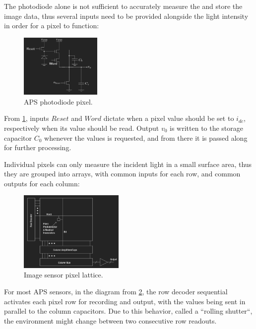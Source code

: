 The photodiode alone is not sufficient to accurately measure the and store the image data, thus several inputs need to
be provided alongside the light intensity in order for a pixel to function:

\begin{figure}[H]
    \includegraphics[width=0.35\textwidth, height=0.35\textwidth]{resources/png/pixel.png}
    \caption{APS photodiode pixel. \cite{stanford} \label{figPixel}}
\end{figure}

From \ref{figPixel}, inputs \(Reset\) and \(Word\) dictate when a pixel value should be set to \(i_{dc}\), respectively
when its value should be read. Output \(v_{0}\) is written to the storage capacitor \(C_{0}\) whenever the values
is requested, and from there it is passed along for further processing.

Individual pixels can only measure the incident light in a small surface area, thus they are grouped into arrays, with 
common inputs for each row, and common outputs for each column:

\begin{figure}[H]
    \includegraphics[width=0.45\textwidth, height=0.45\textwidth]{resources/png/lattice.png}
    \caption{Image sensor pixel lattice. \cite{stanford} \label{figLatice}}
\end{figure}

For most APS sensors, in the diagram from \ref{figLatice}, the row decoder sequential activates each pixel row for recording
and output, with the values being sent in parallel to the column capacitors. Due to this behavior, called a ``rolling shutter``, 
the environment might change between two consecutive row readouts.

